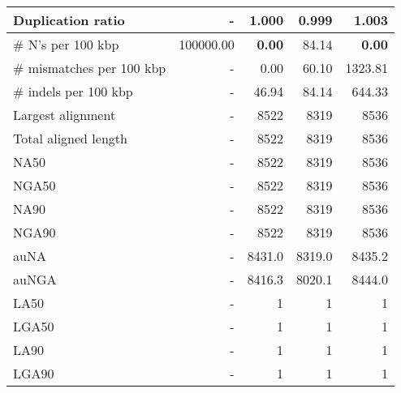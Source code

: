 \documentclass[12pt,a4paper]{article}
\begin{document}
\begin{table}[ht]
\begin{center}
\begin{tabular}{|l*{4}{|r}|}
Duplication ratio & - & 1.000 & 0.999 & 1.003 \\ \hline
\# N's per 100 kbp & 100000.00 & {\bf 0.00} & 84.14 & {\bf 0.00} \\ \hline
\# mismatches per 100 kbp & - & 0.00 & 60.10 & 1323.81 \\ \hline
\# indels per 100 kbp & - & 46.94 & 84.14 & 644.33 \\ \hline
Largest alignment & - & 8522 & 8319 & 8536 \\ \hline
Total aligned length & - & 8522 & 8319 & 8536 \\ \hline
NA50 & - & 8522 & 8319 & 8536 \\ \hline
NGA50 & - & 8522 & 8319 & 8536 \\ \hline
NA90 & - & 8522 & 8319 & 8536 \\ \hline
NGA90 & - & 8522 & 8319 & 8536 \\ \hline
auNA & - & 8431.0 & 8319.0 & 8435.2 \\ \hline
auNGA & - & 8416.3 & 8020.1 & 8444.0 \\ \hline
LA50 & - & 1 & 1 & 1 \\ \hline
LGA50 & - & 1 & 1 & 1 \\ \hline
LA90 & - & 1 & 1 & 1 \\ \hline
LGA90 & - & 1 & 1 & 1 \\ \hline
\end{tabular}
\end{center}
\end{table}
\end{document}
